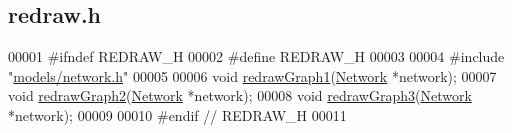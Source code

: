\hypertarget{redraw_8h_source}{}\subsection{redraw.\+h}
\label{redraw_8h_source}

\begin{DoxyCode}
00001 \textcolor{preprocessor}{#ifndef REDRAW\_H}
00002 \textcolor{preprocessor}{#define REDRAW\_H}
00003 
00004 \textcolor{preprocessor}{#include "\hyperlink{network_8h}{models/network.h}"}
00005 
00006 \textcolor{keywordtype}{void} \hyperlink{redraw_8h_ae0faf7c4b627874b04cd8fd6d32bc8aa}{redrawGraph1}(\hyperlink{class_network}{Network} *network);
00007 \textcolor{keywordtype}{void} \hyperlink{redraw_8h_ad9c6f1e3f121ffdcbf70c98d31a442f0}{redrawGraph2}(\hyperlink{class_network}{Network} *network);
00008 \textcolor{keywordtype}{void} \hyperlink{redraw_8h_a16e73f8fcaf10fb71fc8e7d719db919e}{redrawGraph3}(\hyperlink{class_network}{Network} *network);
00009 
00010 \textcolor{preprocessor}{#endif // REDRAW\_H}
00011 
\end{DoxyCode}
